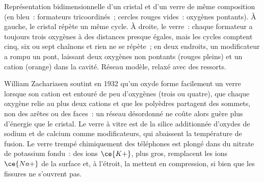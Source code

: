 \begin{omfigure}

{\small Représentation bidimensionnelle d'un cristal et d'un verre de même
composition (en bleu~: formateurs tricoordinés~; cercles rouges vides~:
oxygènes pontants). À gauche, le cristal répète un même cycle. À droite, le
verre~: chaque formateur a toujours trois oxygènes à des distances presque
égales, mais les cycles comptent cinq, six ou sept chaînons et rien ne se
répète~; en deux endroits, un modificateur a rompu un pont, laissant deux
oxygènes non pontants (rouges pleins) et un cation (orange) dans la cavité.
Réseau modèle, relaxé avec des ressorts.}
\end{omfigure}

William Zachariasen soutint en 1932 qu'un oxyde forme facilement un verre
lorsque son cation est entouré de peu d'oxygènes (trois ou quatre), que
chaque oxygène relie au plus deux cations et que les polyèdres partagent
des sommets, non des arêtes ou des faces~: un réseau désordonné ne coûte
alors guère plus d'énergie que le cristal. Le verre à vitre est de la
silice additionnée d'oxydes de sodium et de calcium comme modificateurs, qui
abaissent la température de fusion. Le verre trempé chimiquement des
téléphones est plongé dans du nitrate de potassium fondu~: des ions $\ce{K+}$, plus gros,
remplacent les ions $\ce{Na+}$ de la surface et, à l'étroit, la mettent en compression, si
bien que les fissures ne s'ouvrent pas.

